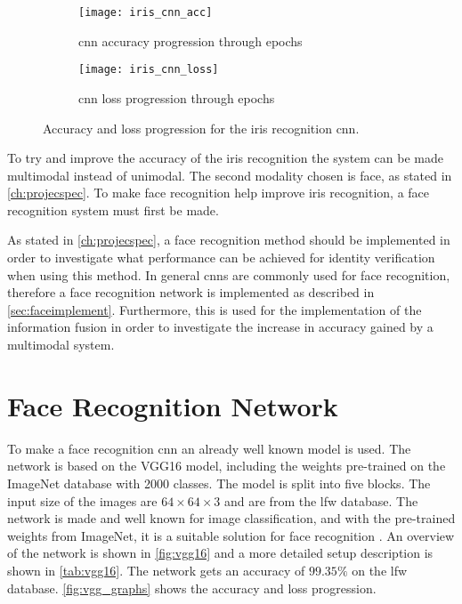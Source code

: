 \begin{figure}[H]
	\centering
	\begin{subfigure}{0.48\textwidth}
		\centering
		\texttt{[image: iris\_cnn\_acc]}
		\caption{\gls{cnn} accuracy progression through epochs}
		\label{fig:iris_cnn_acc}
	\end{subfigure}
	\begin{subfigure}{0.48\textwidth}
		\centering
		\texttt{[image: iris\_cnn\_loss]}
		\caption{\gls{cnn} loss progression through epochs}
		\label{fig:iris_cnn_loss}
	\end{subfigure}
	\caption{Accuracy and loss progression for the iris recognition \gls{cnn}.}
	\label{fig:iris_graphs}
\end{figure}

\noindent To try and improve the accuracy of the iris recognition the system can be made multimodal instead of unimodal. The second modality chosen is face, as stated in \autoref{ch:projecspec}. To make face recognition help improve iris recognition, a face recognition system must first be made.

As stated in \autoref{ch:projecspec}, a face recognition method should be implemented in order to investigate what performance can be achieved for identity verification when using this method. In general \gls{cnn}s are commonly used for face recognition, therefore a face recognition network is implemented as described in \autoref{sec:faceimplement}. Furthermore, this is used for the implementation of the information fusion in order to investigate the increase in accuracy gained by a multimodal system.

\section{Face Recognition Network}
\label{sec:faceimplement}
To make a face recognition \gls{cnn} an already well known model is used. The network is based on the VGG16 model, including the weights pre-trained on the ImageNet database with 2000 classes. The model is split into five blocks. The input size of the images are $64\times64\times3$ and are from the \gls{lfw} database. The network is made and well known for image classification, and with the pre-trained weights from ImageNet, it is a suitable solution for face recognition \citep{Simonyan2015}.
An overview of the network is shown in \autoref{fig:vgg16} and a more detailed setup description is shown in \autoref{tab:vgg16}. The network gets an accuracy of $99.35\%$ on the \gls{lfw} database. \autoref{fig:vgg_graphs} shows the accuracy and loss progression.

